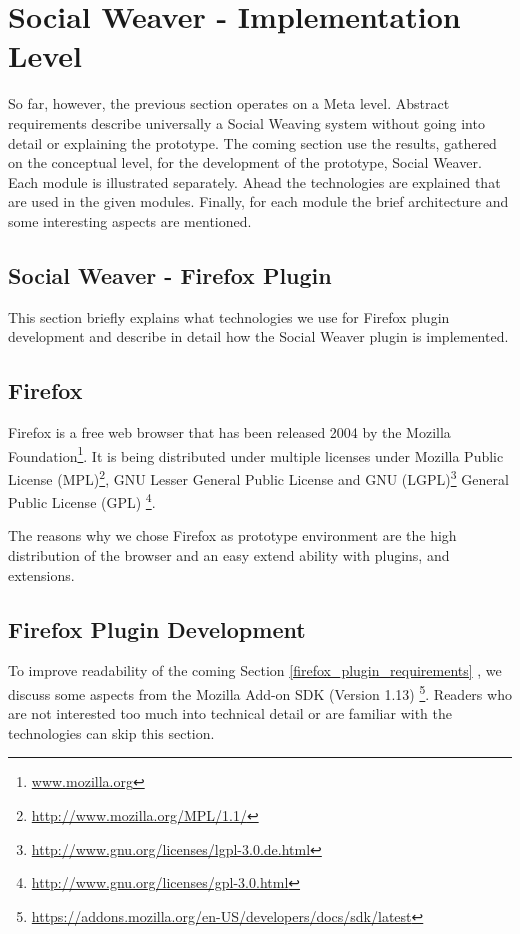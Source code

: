 \section{Social Weaver - Implementation Level}\label{sowe-concrete}
So far, however, the previous section operates on a Meta level. Abstract requirements describe universally a Social Weaving system without going into detail or explaining the prototype. The coming section use the results, gathered on the conceptual level, for the development of the prototype, Social Weaver. 
Each module is illustrated separately. Ahead the technologies are explained that are used in the given modules. Finally, for each module the brief architecture and some interesting aspects are mentioned. 

\subsection{Social Weaver - Firefox Plugin} \label{sowe-firefox}
This section briefly explains what technologies we use for Firefox plugin development and describe in detail how the Social Weaver plugin is implemented.

\subsection*{Firefox}
Firefox is a free web browser that has been released 2004 by the Mozilla Foundation\footnote{\url{www.mozilla.org}}. It is being distributed under multiple licenses under Mozilla Public License (MPL)\footnote{\url{http://www.mozilla.org/MPL/1.1/}}, GNU Lesser General Public License and GNU (LGPL)\footnote{\url{http://www.gnu.org/licenses/lgpl-3.0.de.html}} General Public License (GPL) \footnote{\url{http://www.gnu.org/licenses/gpl-3.0.html}}. 

The reasons why we chose Firefox as prototype environment are the high distribution of the browser and an easy extend ability with plugins, and extensions.

\subsection*{Firefox Plugin Development}
To improve readability of the coming Section \ref{firefox_plugin_requirements} , we discuss some aspects from the Mozilla Add-on SDK (Version 1.13) \footnote{\url{https://addons.mozilla.org/en-US/developers/docs/sdk/latest}}. Readers who are not interested too much into technical detail or are familiar with the technologies can skip this section.

